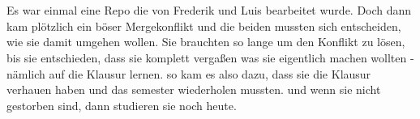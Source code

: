 
\newcommand{\germanQuote}[1]{„\textit{#1}“}
\newcommand{\englishQuote}[1]{``\textit{#1}''}



\chapter{\chapterOne}
Es war einmal eine Repo die von Frederik und Luis bearbeitet wurde.
Doch dann kam plötzlich ein böser Mergekonflikt und die beiden mussten sich entscheiden, wie sie damit umgehen wollen.
Sie brauchten so lange um den Konflikt zu lösen, bis sie entschieden, dass sie komplett vergaßen was sie eigentlich machen wollten - nämlich auf die Klausur lernen.
so kam es also dazu, dass sie die Klausur verhauen haben und das semester wiederholen mussten.
und wenn sie nicht gestorben sind, dann studieren sie noch heute.

